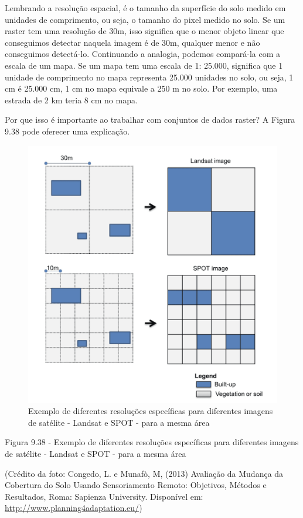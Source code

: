 \documentclass[
]{krantz}
\begin{document}
Lembrando a resolução espacial, é o tamanho da superfície do solo medido em unidades de comprimento, ou seja, o tamanho do pixel medido no solo. Se um raster tem uma resolução de 30m, isso significa que o menor objeto linear que conseguimos detectar naquela imagem é de 30m, qualquer menor e não conseguimos detectá-lo. Continuando a analogia, podemos compará-la com a escala de um mapa. Se um mapa tem uma escala de 1: 25.000, significa que 1 unidade de comprimento no mapa representa 25.000 unidades no solo, ou seja, 1 cm é 25.000 cm, 1 cm no mapa equivale a 250 m no solo. Por exemplo, uma estrada de 2 km teria 8 cm no mapa.

Por que isso é importante ao trabalhar com conjuntos de dados raster? A Figura 9.38 pode oferecer uma explicação.

\begin{figure}
\centering
\includegraphics{media/modulo9/fig938.png}
\caption{Exemplo de diferentes resoluções específicas para diferentes imagens de satélite - Landsat e SPOT - para a mesma área}
\end{figure}

Figura 9.38 - Exemplo de diferentes resoluções específicas para diferentes imagens de satélite - Landsat e SPOT - para a mesma área

(Crédito da foto: Congedo, L. e Munafò, M, (2013) Avaliação da Mudança da Cobertura do Solo Usando Sensoriamento Remoto: Objetivos, Métodos e Resultados, Roma: Sapienza University. Disponível em: \url{http://www.planning4adaptation.eu/})
\end{document}

